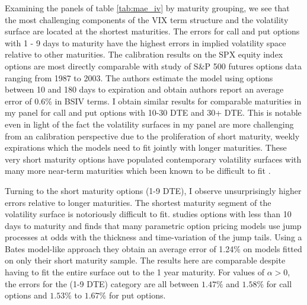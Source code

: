 \documentclass[12pt]{article}
\begin{document}
Examining the panels of table \ref{tab:mae_iv} by maturity grouping, we see that the most challenging components of the VIX term structure and the volatility surface are located at the shortest maturities. The errors for call and put options with 1 - 9 days to maturity have the highest errors in implied volatility space relative to other maturities. The calibration results on the SPX equity index options are most directly comparable with \cite{broadie2007model} study of S\&P 500 futures options data ranging from 1987 to 2003. The authors estimate the \cite{bates1996jumps} model using options between 10 and 180 days to expiration and obtain authors report an average error of 0.6\% in BSIV terms. I obtain similar results for comparable maturities in my panel for call and put options with 10-30 DTE and 30+ DTE. This is notable even in light of the fact the volatility surfaces in my panel are more challenging from an calibration perspective due to the proliferation of short maturity, weekly expirations which the models need to fit jointly with longer maturities. These very short maturity options have populated contemporary volatility surfaces with many more near-term maturities which been known to be difficult to fit \citep{bandi2024local, bandi0dte}. 

Turning to the short maturity options (1-9 DTE), I observe unsurprisingly higher errors relative to longer maturities. The shortest maturity segment of the volatility surface is notoriously difficult to fit. \cite{andersen2017short} studies options with less than 10 days to maturity and finds that many parametric option pricing models use jump processes at odds with the thickness and time-variation of the jump tails. Using a Bates model-like approach they obtain an average error of 1.24\% on models fitted on only their short maturity sample. The results here are comparable despite having to fit the entire surface out to the 1 year maturity. For values of $\alpha > 0$, the errors for the (1-9 DTE) category are all between $1.47\%$ and $1.58\%$ for call options and $1.53\%$ to $1.67\%$  for put options.
\end{document}
